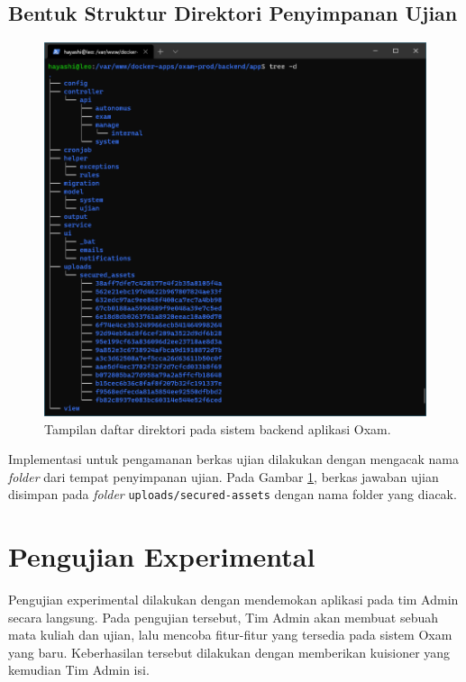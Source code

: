     \subsection{Bentuk Struktur Direktori Penyimpanan Ujian}
    \begin{figure}[hb]
        \centering
        \includegraphics[width=0.6\paperwidth]{Gambar/Screenshot 2021-01-16 014010.png}
        \caption{Tampilan daftar direktori pada sistem backend aplikasi Oxam.}
        \label{fig:dirlisting}
    \end{figure}
    Implementasi untuk pengamanan berkas ujian dilakukan dengan mengacak nama \textit{folder}
    dari tempat penyimpanan ujian. Pada Gambar \ref{fig:dirlisting}, berkas jawaban ujian disimpan pada
    \textit{folder} \texttt{uploads/secured-assets} dengan nama folder yang diacak.


\section{Pengujian Experimental}
    Pengujian experimental dilakukan dengan mendemokan aplikasi pada tim Admin secara langsung. Pada pengujian
    tersebut, Tim Admin akan membuat sebuah mata kuliah dan ujian, lalu mencoba fitur-fitur yang tersedia
    pada sistem Oxam yang baru. Keberhasilan tersebut dilakukan dengan memberikan kuisioner yang kemudian
    Tim Admin isi.
    
